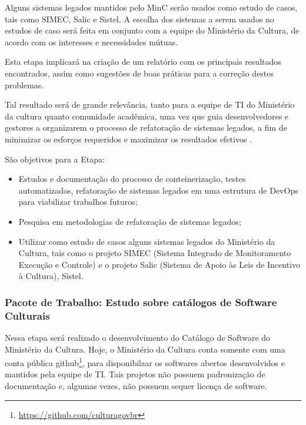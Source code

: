 Alguns sistemas legados mantidos pelo MinC serão usados como estudo de casos, tais 
como SIMEC, Salic e Sistel. A escolha dos sistemas a serem usados no estudos de 
caso será feita em conjunto com a equipe do Ministério da Cultura, de acordo com 
os interesses e necessidades mútuas.

Esta etapa implicará na criação de um relatório com os principais resultados 
encontrados, assim como sugestões de boas práticas para a correção destes problemas. 
 
Tal resultado será de grande relevância, tanto para a equipe  de TI do Ministério 
da cultura quanto comunidade acadêmica, uma vez que guia desenvolvedores e gestores 
a organizarem o processo de refatoração de sistemas legados, a fim de minimizar 
os esforços requeridos e maximizar os resultados efetivos \cite{Khanam2017refact}.

São objetivos para a Etapa:

\begin{itemize}
 \item Estudos e documentação do processo de conteinerização, testes automatizados, 
  refatoração de sistemas legados em uma estrutura de DevOps para viabilizar trabalhos futuros;
\item Pesquisa em metodologias de refatoração de sistemas legados;
\item Utilizar como estudo de casos alguns sistemas legados do Ministério da 
  Cultura, tais como o projeto SIMEC (Sistema Integrado de Monitoramento Execução 
  e Controle) e o projeto Salic (Sistema de Apoio às Leis de Incentivo à Cultura), Sistel. 
\end{itemize}


\subsubsection{Pacote de Trabalho: Estudo sobre catálogos de Software Culturais}

Nessa etapa será realizado o desenvolvimento do Catálogo de Software do Ministério 
da Cultura. Hoje, o Ministério da Cultura conta somente com uma conta pública 
github\footnote{\url{https://github.com/culturagovbr}}, para disponibilzar os 
softwares abertos desenvolvidos e mantidos pela equipe de TI. Tais projetos não 
possuem padronização de documentação e, algumas vezes, não possuem sequer licença de software. 

